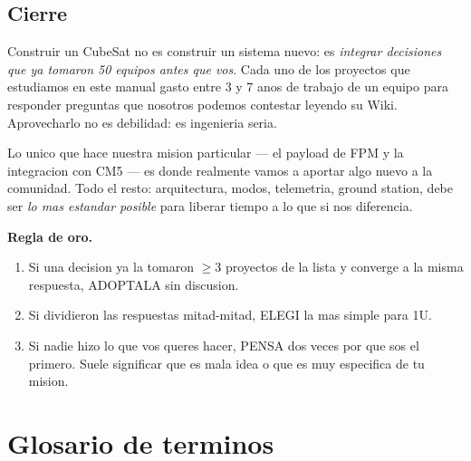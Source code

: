 \documentclass[11pt,a4paper,oneside,openright]{book}
\begin{document}
\section{Cierre}

Construir un CubeSat no es construir un sistema nuevo: es \emph{integrar
decisiones que ya tomaron 50 equipos antes que vos}. Cada uno de los
proyectos que estudiamos en este manual gasto entre 3 y 7 anos de
trabajo de un equipo para responder preguntas que nosotros podemos
contestar leyendo su Wiki. Aprovecharlo no es debilidad: es ingenieria
seria.

Lo unico que hace nuestra mision particular --- el payload de FPM
y la integracion con CM5 --- es donde realmente vamos a aportar algo
nuevo a la comunidad. Todo el resto: arquitectura, modos, telemetria,
ground station, debe ser \emph{lo mas estandar posible} para
liberar tiempo a lo que si nos diferencia.

\begin{logrado}
\textbf{Regla de oro.}
\begin{enumerate}[leftmargin=2em]
  \item Si una decision ya la tomaron $\geq 3$ proyectos de la lista
    y converge a la misma respuesta, ADOPTALA sin discusion.
  \item Si dividieron las respuestas mitad-mitad, ELEGI la mas
    simple para 1U.
  \item Si nadie hizo lo que vos queres hacer, PENSA dos veces por
    que sos el primero. Suele significar que es mala idea o que es
    muy especifica de tu mision.
\end{enumerate}
\end{logrado}

\appendix

\chapter{Glosario de terminos}
\end{document}
